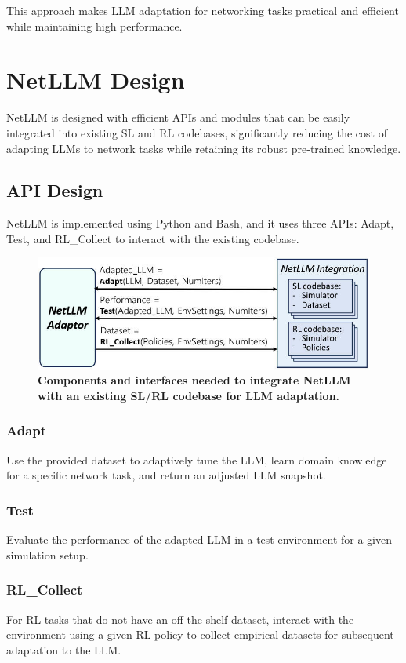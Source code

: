 \documentclass[twocolumn]{article}
\begin{document}
This approach makes LLM adaptation for networking tasks practical and efficient while maintaining high performance.

\section{NetLLM Design}

NetLLM is designed with efficient APIs and modules that can be easily integrated into existing SL and RL codebases, significantly reducing the cost of adapting LLMs to network tasks while retaining its robust pre-trained knowledge.

\subsection{API Design}
NetLLM is implemented using Python and Bash, and it uses three APIs: Adapt, Test, and RL\_Collect to interact with the existing codebase.

\begin{figure}[t]
  \centering
  \includegraphics[width=1\linewidth]{img/figure7.jpg}
  \caption{\textbf{Components and interfaces needed to integrate NetLLM with an existing SL/RL codebase for LLM adaptation.}}
  \label{fig:9}
\end{figure}

\subsubsection{Adapt}
Use the provided dataset to adaptively tune the LLM, learn domain knowledge for a specific network task, and return an adjusted LLM snapshot.

\subsubsection{Test}
Evaluate the performance of the adapted LLM in a test environment for a given simulation setup.

\subsubsection{RL\_Collect}
For RL tasks that do not have an off-the-shelf dataset, interact with the environment using a given RL policy to collect empirical datasets for subsequent adaptation to the LLM.
\end{document}
